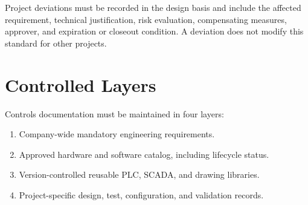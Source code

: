 Project deviations must be recorded in the design basis and include the affected requirement, technical justification, risk evaluation, compensating measures, approver, and expiration or closeout condition. A deviation does not modify this standard for other projects.

\section{Controlled Layers}
Controls documentation must be maintained in four layers:
\begin{enumerate}[itemsep=2pt]
  \item Company-wide mandatory engineering requirements.
  \item Approved hardware and software catalog, including lifecycle status.
  \item Version-controlled reusable PLC, SCADA, and drawing libraries.
  \item Project-specific design, test, configuration, and validation records.
\end{enumerate}
